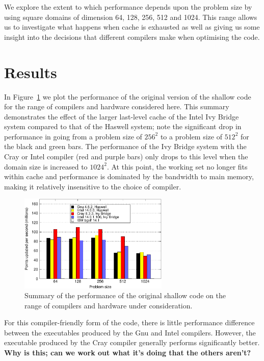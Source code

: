 \documentclass[journal]{IEEEtran}
\begin{document}
We explore the extent to which performance depends upon the problem
size by using square domains of dimension 64, 128, 256, 512 and
1024. This range allows us to investigate what happens when cache is
exhausted as well as giving us some insight into the decisions that
different compilers make when optimising the code.

\section{Results}

In Figure~\ref{FIG_orig_perf_summary} we plot the performance of the
original version of the shallow code for the range of compilers and
hardware considered here. This summary demonstrates the effect of the
larger last-level cache of the Intel Ivy Bridge system compared to
that of the Haswell system; note the significant drop in performance
in going from a problem size of $256^{2}$ to a problem size of
$512^{2}$ for the black and green bars. The performance of the Ivy
Bridge system with the Cray or Intel compiler (red and purple bars)
only drops to this level when the domain size is increased to
$1024^{2}$. At this point, the working set no longer fits within cache
and performance is dominated by the bandwidth to main memory, making
it relatively insensitive to the choice of compiler.

\begin{figure}[!t]
\centering
\includegraphics[width=2.8in]{orig_summary}
\caption{Summary of the performance of the original shallow code on 
the range of compilers and hardware under consideration.}
\label{FIG_orig_perf_summary}
\end{figure}

For this compiler-friendly form of the code, there is little
performance difference between the executables produced by the Gnu and
Intel compilers. However, the executable produced by the Cray compiler
generally performs significantly better. {\bf Why is this; can we work
out what it's doing that the others aren't?}
\end{document}
